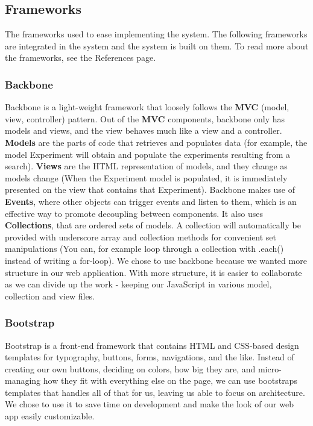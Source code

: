 \subsection{Frameworks}
\label{sec:web_frame}
The frameworks used to ease implementing the system. The following frameworks are integrated in the system and the system is built on them. To read more about the frameworks, see the References page.
\subsubsection{Backbone}
Backbone\cite{web_1} is a light-weight framework that loosely follows the \textbf{MVC} (model, view, controller) pattern. Out of the \textbf{MVC} components, backbone only has models and views, and the view behaves much like a view and a controller. \textbf{Models} are the parts of code that retrieves and populates data (for example, the model Experiment will obtain and populate the experiments resulting from a search). \textbf{Views} are the HTML representation of models, and they change as models change (When the Experiment model is populated, it is immediately presented on the view that contains that Experiment).
Backbone makes use of \textbf{Events}, where other objects can trigger events and listen to them, which is an effective way to promote decoupling between components. It also uses \textbf{Collections}, that are ordered sets of models. A collection will automatically be provided with underscore array and collection methods for convenient set manipulations (You can, for example loop through a collection with .each() instead of writing a for-loop). We chose to use backbone because we wanted more structure in our web application. With more structure, it is easier to collaborate as we can divide up the work - keeping our JavaScript in various model, collection and view files.

\subsubsection{Bootstrap}
Bootstrap\cite{web_2} is a front-end framework that contains HTML and CSS-based design templates for typography, buttons, forms, navigations, and the like. Instead of creating our own buttons, deciding on colors, how big they are, and micro-managing how they fit with everything else on the page, we can use bootstraps templates that handles all of that for us, leaving us able to focus on architecture. We chose to use it to save time on development and make the look of our web app easily customizable.
